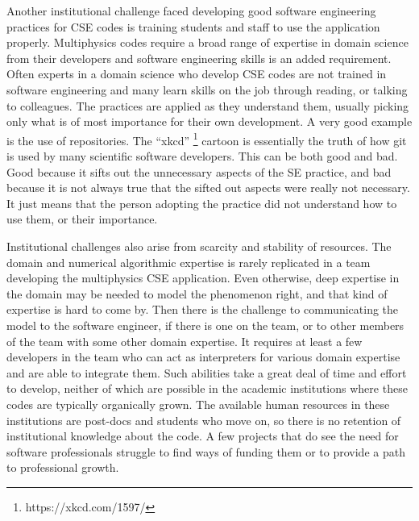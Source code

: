 Another institutional challenge faced developing good software
engineering practices for CSE codes is training students and staff to
use the application properly. Multiphysics codes require a broad range
of expertise in domain science from their developers and software
engineering skills is an added requirement.  Often experts in a domain
science who develop CSE codes are not trained in software engineering
and many learn skills on the job through reading, or talking to
colleagues. The practices are applied as they understand them, usually
picking only what is of most importance for their own development. A
very good example is the use of repositories. The ``xkcd''
\footnote{https://xkcd.com/1597/} cartoon is
essentially the truth of how git is used by many scientific software
developers. 
This can be both good and bad. Good because it sifts out the unnecessary aspects of the SE
practice, and bad because it is not always true that the sifted out
aspects were really not necessary. It just means that the person
adopting the practice did not understand how to use them, or their
importance. 


Institutional challenges also arise from scarcity and stability of
resources. The domain and numerical algorithmic
expertise is rarely replicated in a team developing the multiphysics
CSE application.  Even otherwise, deep expertise in the domain may be
needed to model the phenomenon right, and that kind of expertise is
hard to come by. Then there is the challenge to communicating the
model to the software engineer, if there is one on the team, or to
other members of the team with some other domain expertise. It requires at least a
few developers in the team who can act as interpreters for various
domain expertise and are able to integrate them. Such abilities take a
great deal of time and effort to develop, neither of which are
possible in the academic institutions where these codes are typically
organically grown. The available human resources in these institutions
are post-docs and students who move on, so there is no retention of
institutional knowledge about the code.  A few projects that do see
the need for software professionals struggle to find ways of funding
them or to provide a path to professional growth. 

